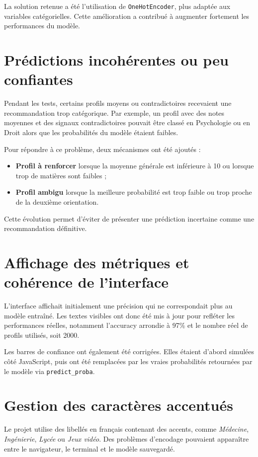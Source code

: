 \documentclass[12pt,a4paper]{report}
\begin{document}
La solution retenue a été l'utilisation de \texttt{OneHotEncoder}, plus adaptée aux variables catégorielles. Cette amélioration a contribué à augmenter fortement les performances du modèle.

\section{Prédictions incohérentes ou peu confiantes}
Pendant les tests, certains profils moyens ou contradictoires recevaient une recommandation trop catégorique. Par exemple, un profil avec des notes moyennes et des signaux contradictoires pouvait être classé en Psychologie ou en Droit alors que les probabilités du modèle étaient faibles.

Pour répondre à ce problème, deux mécanismes ont été ajoutés :
\begin{itemize}[label=--]
    \item \textbf{Profil à renforcer} lorsque la moyenne générale est inférieure à 10 ou lorsque trop de matières sont faibles ;
    \item \textbf{Profil ambigu} lorsque la meilleure probabilité est trop faible ou trop proche de la deuxième orientation.
\end{itemize}

Cette évolution permet d'éviter de présenter une prédiction incertaine comme une recommandation définitive.

\section{Affichage des métriques et cohérence de l'interface}
L'interface affichait initialement une précision qui ne correspondait plus au modèle entraîné. Les textes visibles ont donc été mis à jour pour refléter les performances réelles, notamment l'accuracy arrondie à 97\% et le nombre réel de profils utilisés, soit 2000.

Les barres de confiance ont également été corrigées. Elles étaient d'abord simulées côté JavaScript, puis ont été remplacées par les vraies probabilités retournées par le modèle via \texttt{predict\_proba}.

\section{Gestion des caractères accentués}
Le projet utilise des libellés en français contenant des accents, comme \textit{Médecine}, \textit{Ingénierie}, \textit{Lycée} ou \textit{Jeux vidéo}. Des problèmes d'encodage pouvaient apparaître entre le navigateur, le terminal et le modèle sauvegardé.
\end{document}
